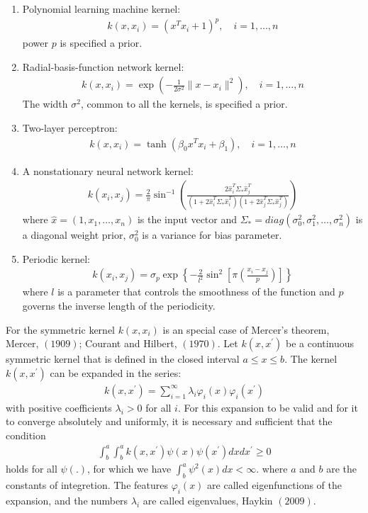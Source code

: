  \begin{enumerate}
 \item Polynomial learning machine kernel:
 \begin{align*}
 k\left(x,x_{i}\right)=\left(x^{T}x_{i} +1\right)^{p},\quad i=1,\ldots,n
 \end{align*}
 power $p$ is specified a prior.
 \item Radial-basis-function network kernel:
 \begin{align*}
 k\left(x,x_{i}\right)= \exp\left(-\frac{1}{2\sigma^{2}}\|x-x_{i}\|^{2}\right),\quad i=1,\ldots,n
 \end{align*}
 The width $\sigma^{2}$, common to all the kernels, is specified a prior.
\item Two-layer perceptron:
 \begin{align*}
 k\left(x,x_{i}\right)=\tanh\left(\beta_{0}x^{T}x_{i}+\beta_{1} \right),\quad i=1,\ldots,n
\end{align*}
\item A nonstationary neural network kernel:
\begin{align*}
	k\left(x_{i},x_{j}\right)=\frac{2}{\pi}\sin^{-1}
	\left(\frac{2\hat{x}_{i}^{T}\Sigma_{*}\hat{x}_{j}^{T}}
	{\left( 1+2\hat{x}_{i}^{T}\Sigma_{*}\hat{x}_{i}^{T}\right) 
		\left(1+2\hat{x}_{j}^{T}\Sigma_{*}\hat{x}_{j}^{T} \right) } \right) 
\end{align*}
where $\hat{x}=(1,x_{1},\ldots,x_{n})$ is the input vector and 
$\Sigma_{*}=diag\left(\sigma_{0}^{2},\sigma_{1}^{2},\ldots,\sigma_{n}^{2} \right)$
is a diagonal weight prior, $\sigma_{0}^{2}$ is a variance for bias parameter.
\item Periodic kernel:
\begin{align*}
	k\left(x_{i},x_{j}\right)=\sigma_{p}\exp\left\{-\frac{2}{l^{2}}\sin^{2}
	\left[\pi\left(\frac{x_{i}-x_{j}}{p} \right)\right]\right\}  
\end{align*}
where $l$ is a parameter that controls the smoothness of the function
and $p$ governs the inverse length of the periodicity.
 \end{enumerate}
 For the symmetric kernel $k\left(x,x_{i}\right)$ is an special case of Mercer’s theorem,
 Mercer, $(1909)$; Courant and Hilbert, $(1970)$.
 Let $k(x,x^{\prime})$ be a continuous symmetric kernel that is defined in the closed interval
 $a\leq x\leq b$. The kernel $k(x,x^{\prime})$ can be expanded in the series:
 \begin{align*}
 k\left(x,x^{\prime}\right)=\sum_{i=1}^{\infty}\lambda_{i}\varphi_{i}(x)\varphi_{i}(x^{\prime})
 \end{align*}
 with positive coefficients  $\lambda_{i} >0$ for all $i$. For this expansion to be valid and 
 for it to converge absolutely and uniformly, it is necessary and sufficient that the condition
  \begin{align*}
  \int_{b}^{a}\int_{b}^{a} k\left(x,x^{\prime}\right)\psi(x)\psi(x^{\prime})dxdx^{\prime}\geq 0
 \end{align*}
 holds for all $\psi(.)$, for which we have $\int_{b}^{a}\psi^{2}(x)dx<\infty$.
 where $a$ and $b$ are the constants of integretion.
 The features $\varphi_{i}(x)$ are called eigenfunctions of the expansion, and the numbers 
 $\lambda_{i}$ are called eigenvalues, Haykin $(2009)$.
